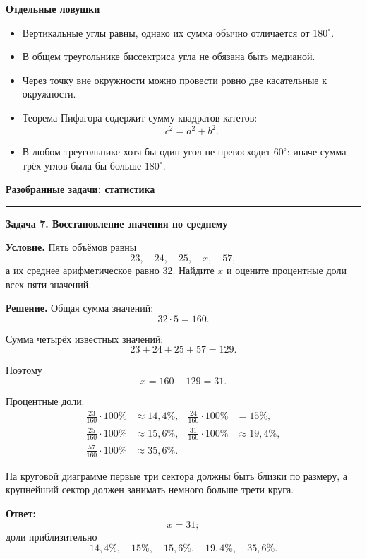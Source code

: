 \documentclass[a4paper,12pt]{article}
\newcommand{\Section}[1]{%
  \Needspace{5\baselineskip}%
  \vspace{0.6em}%
  {\Large\bfseries\color{darkaccent}#1}\par
  \vspace{0.2em}%
  {\color{accent}\rule{0.14\linewidth}{1.2pt}}\par
  \vspace{0.4em}%
}
\newcommand{\Subsection}[1]{%
  \Needspace{3\baselineskip}%
  \vspace{0.45em}%
  {\large\bfseries\color{darkaccent}#1}\par
  \vspace{0.15em}%
}
\newcommand{\Key}[1]{\textbf{\color{darkaccent}#1}}
\newcommand{\degree}{^{\circ}}
\begin{document}
\Subsection{Отдельные ловушки}

\begin{itemize}
  \item
  Вертикальные углы равны, однако их сумма обычно отличается от
  $180\degree$.

  \item
  В общем треугольнике биссектриса угла не обязана быть медианой.

  \item
  Через точку вне окружности можно провести ровно две касательные
  к окружности.

  \item
  Теорема Пифагора содержит сумму квадратов катетов:
  \[
    c^2=a^2+b^2.
  \]

  \item
  В любом треугольнике хотя бы один угол не превосходит $60\degree$:
  иначе сумма трёх углов была бы больше $180\degree$.
\end{itemize}

\Section{Разобранные задачи: статистика}
\enlargethispage{2\baselineskip}

\Subsection{Задача 7. Восстановление значения по среднему}

\Key{Условие.}
Пять объёмов равны
\[
  23,\quad24,\quad25,\quad x,\quad57,
\]
а их среднее арифметическое равно $32$.
Найдите $x$ и оцените процентные доли всех пяти значений.

\Key{Решение.}
Общая сумма значений:
\[
  32\cdot5=160.
\]

Сумма четырёх известных значений:
\[
  23+24+25+57=129.
\]

Поэтому
\[
  x=160-129=31.
\]

Процентные доли:
\[
\begin{aligned}
  \frac{23}{160}\cdot100\%
  &\approx14{,}4\%,
  &
  \frac{24}{160}\cdot100\%
  &=15\%,
  \\
  \frac{25}{160}\cdot100\%
  &\approx15{,}6\%,
  &
  \frac{31}{160}\cdot100\%
  &\approx19{,}4\%,
  \\
  \frac{57}{160}\cdot100\%
  &\approx35{,}6\%.
\end{aligned}
\]

На круговой диаграмме первые три сектора должны быть близки по размеру,
а крупнейший сектор должен занимать немного больше трети круга.

\Key{Ответ:}
\[
  x=31;
\]
доли приблизительно
\[
  14{,}4\%,\quad
  15\%,\quad
  15{,}6\%,\quad
  19{,}4\%,\quad
  35{,}6\%.
\]
\end{document}
